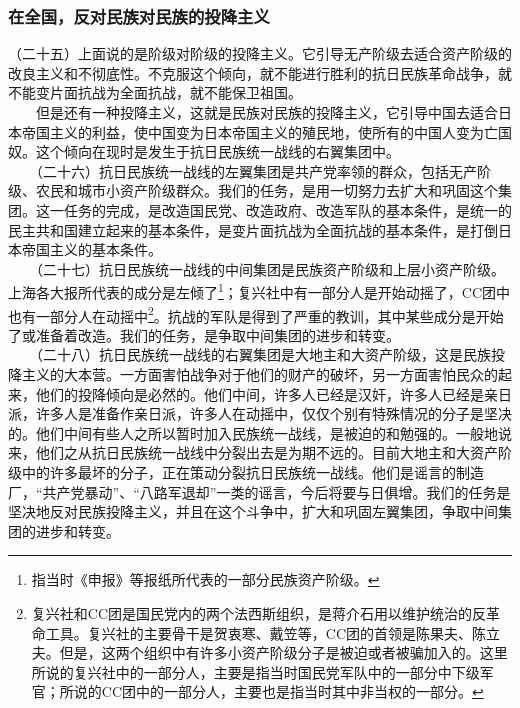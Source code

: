 \documentclass[cn,11pt,chinese]{elegantbook}
\def\myformat#1{\hfil\hfil #1}
\begin{document}
\subsubsection*{\myformat{在全国，反对民族对民族的投降主义}}
（二十五）上面说的是阶级对阶级的投降主义。它引导无产阶级去适合资产阶级的改良主义和不彻底性。不克服这个倾向，就不能进行胜利的抗日民族革命战争，就不能变片面抗战为全面抗战，就不能保卫祖国。\\
　　但是还有一种投降主义，这就是民族对民族的投降主义，它引导中国去适合日本帝国主义的利益，使中国变为日本帝国主义的殖民地，使所有的中国人变为亡国奴。这个倾向在现时是发生于抗日民族统一战线的右翼集团中。\\
　　（二十六）抗日民族统一战线的左翼集团是共产党率领的群众，包括无产阶级、农民和城市小资产阶级群众。我们的任务，是用一切努力去扩大和巩固这个集团。这一任务的完成，是改造国民党、改造政府、改造军队的基本条件，是统一的民主共和国建立起来的基本条件，是变片面抗战为全面抗战的基本条件，是打倒日本帝国主义的基本条件。\\
　　（二十七）抗日民族统一战线的中间集团是民族资产阶级和上层小资产阶级。上海各大报所代表的成分是左倾了\footnote[16]{ 指当时《申报》等报纸所代表的一部分民族资产阶级。}；复兴社中有一部分人是开始动摇了，CC团中也有一部分人在动摇中\footnote[17]{ 复兴社和CC团是国民党内的两个法西斯组织，是蒋介石用以维护统治的反革命工具。复兴社的主要骨干是贺衷寒、戴笠等，CC团的首领是陈果夫、陈立夫。但是，这两个组织中有许多小资产阶级分子是被迫或者被骗加入的。这里所说的复兴社中的一部分人，主要是指当时国民党军队中的一部分中下级军官；所说的CC团中的一部分人，主要也是指当时其中非当权的一部分。}。抗战的军队是得到了严重的教训，其中某些成分是开始了或准备着改造。我们的任务，是争取中间集团的进步和转变。\\
　　（二十八）抗日民族统一战线的右翼集团是大地主和大资产阶级，这是民族投降主义的大本营。一方面害怕战争对于他们的财产的破坏，另一方面害怕民众的起来，他们的投降倾向是必然的。他们中间，许多人已经是汉奸，许多人已经是亲日派，许多人是准备作亲日派，许多人在动摇中，仅仅个别有特殊情况的分子是坚决的。他们中间有些人之所以暂时加入民族统一战线，是被迫的和勉强的。一般地说来，他们之从抗日民族统一战线中分裂出去是为期不远的。目前大地主和大资产阶级中的许多最坏的分子，正在策动分裂抗日民族统一战线。他们是谣言的制造厂，“共产党暴动”、“八路军退却”一类的谣言，今后将要与日俱增。我们的任务是坚决地反对民族投降主义，并且在这个斗争中，扩大和巩固左翼集团，争取中间集团的进步和转变。\\
\end{document}
